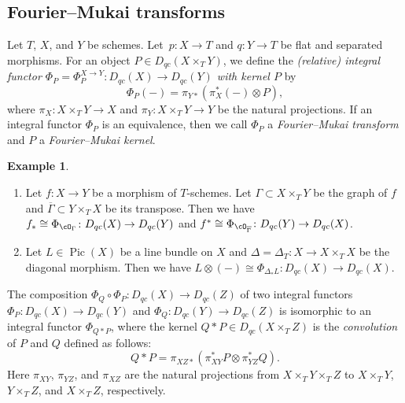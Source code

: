 \documentclass{amsart}
\numberwithin{equation}{section}
\theoremstyle{plain}
\theoremstyle{definition}
\newtheorem{example}[theorem]{Example}
\DeclareMathOperator{\Pic}{\mathrm{Pic}}
\begin{document}
\subsection{Fourier--Mukai transforms}\label{subsection:fourier-mukai-transforms}
Let $T$, $X$, and $Y$ be schemes.
Let\ $p \colon X \to T$ and $q \colon Y \to T$ be flat and separated morphisms.
For an object $P \in D_{qc}(X \times_T Y)$, we define the \emph{(relative) integral functor $\Phi_P = \Phi^{X \to Y}_P \colon D_{qc}(X) \to D_{qc}(Y)$ with kernel $P$} by
\begin{equation}
    \Phi_P(-) = \pi_{Y*}(\pi_{X}^*(-) \otimes P),
\end{equation}
where $\pi_X \colon X \times_T Y \to X$ and $\pi_Y \colon X \times_T Y \to Y$ be the natural projections.
If an integral functor $\Phi_P$ is an equivalence, then we call $\Phi_P$ a \emph{Fourier--Mukai transform} and $P$ a \emph{Fourier--Mukai kernel}.

\begin{example}
    \begin{enumerate}
        \item Let $f \colon X \to Y$ be a morphism of $T$-schemes. Let $\Gamma \subset X \times_T Y$ be the graph of $f$ and $\overline{\Gamma} \subset Y \times_T X$ be its transpose. Then we have $f_* \cong \Phi_{\cO_{\Gamma}} \colon D_{qc}(X) \to D_{qc}(Y)$ and $f^* \cong \Phi_{\cO_{\overline{\Gamma}}} \colon D_{qc}(Y) \to D_{qc}(X)$.
        \item Let $L \in \Pic(X)$ be a line bundle on $X$ and $\Delta = \Delta_T \colon X \to X \times_T X$ be the diagonal morphism. Then we have $L \otimes (-) \cong \Phi_{\Delta_*L} \colon D_{qc}(X) \to D_{qc}(X)$.
    \end{enumerate}
\end{example}

The composition $\Phi_Q \circ \Phi_P \colon D_{qc}(X) \to D_{qc}(Z)$ of two integral functors $\Phi_P \colon D_{qc}(X) \to D_{qc}(Y)$ and $\Phi_Q \colon D_{qc}(Y) \to D_{qc}(Z)$  is isomorphic to an integral functor $\Phi_{Q * P}$, where the kernel $Q * P \in D_{qc}(X \times_T Z)$ is the \emph{convolution} of $P$ and $Q$ defined as follows:
\begin{equation}
    Q * P = \pi_{XZ*}(\pi_{XY}^*P \otimes \pi_{YZ}^*Q).
\end{equation}
Here $\pi_{XY}$, $\pi_{YZ}$, and $\pi_{XZ}$ are the natural projections from $X \times_T Y \times_T Z$ to $X \times_T Y$, $Y \times_T Z$, and $X \times_T Z$, respectively.
\end{document}
